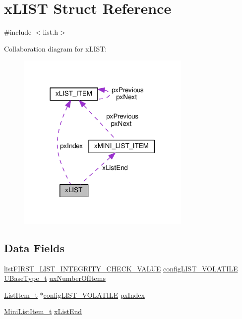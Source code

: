 \hypertarget{structxLIST}{}\section{x\+L\+I\+ST Struct Reference}
\label{structxLIST}


{\ttfamily \#include $<$list.\+h$>$}



Collaboration diagram for x\+L\+I\+ST\+:\nopagebreak
\begin{figure}[H]
\begin{center}
\leavevmode
\includegraphics[width=238pt]{db/da1/structxLIST__coll__graph}
\end{center}
\end{figure}
\subsection*{Data Fields}
\begin{DoxyCompactItemize}
\item 
\hyperlink{list_8h_a3a52b5a4f70d3a07e37a5814a23ba880}{list\+F\+I\+R\+S\+T\+\_\+\+L\+I\+S\+T\+\_\+\+I\+N\+T\+E\+G\+R\+I\+T\+Y\+\_\+\+C\+H\+E\+C\+K\+\_\+\+V\+A\+L\+UE} \hyperlink{list_8h_a2d5de557c5561c8980d1bf51d87d8cba}{config\+L\+I\+S\+T\+\_\+\+V\+O\+L\+A\+T\+I\+LE} \hyperlink{portmacro_8h_a646f89d4298e4f5afd522202b11cb2e6}{U\+Base\+Type\+\_\+t} \hyperlink{structxLIST_aa5cb7cdc699e1252af0441e46e427a03}{ux\+Number\+Of\+Items}
\item 
\hyperlink{list_8h_a1a62d469392f9bfe2443e7efab9c8398}{List\+Item\+\_\+t} $\ast$\hyperlink{list_8h_a2d5de557c5561c8980d1bf51d87d8cba}{config\+L\+I\+S\+T\+\_\+\+V\+O\+L\+A\+T\+I\+LE} \hyperlink{structxLIST_a7bf64d87701493b4c8c5c977682500d7}{px\+Index}
\item 
\hyperlink{list_8h_a542a8d55e98bc407593979e61f83cd02}{Mini\+List\+Item\+\_\+t} \hyperlink{structxLIST_a49ad62fa153126e27e273811167b336a}{x\+List\+End}
\end{DoxyCompactItemize}



